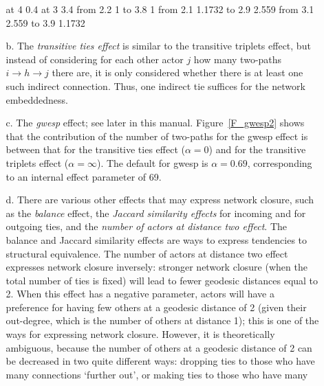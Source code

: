 \documentclass[a4paper,fleqn,11pt]{article}
\newcommand{\+}{\, + \,}
\begin{document}
\begin{enumerate}
\begin{enumerate}
\begin{minipage}[t]{.2\textwidth}
\begin{center}
 at 4 0.4
 at 3 3.4
\arrow <2mm> [.2,.6]  from 2.2 1 to 3.8 1
\arrow <2mm> [.2,.6]  from 2.1 1.1732 to 2.9 2.559
\arrow <2mm> [.2,.6]  from 3.1 2.559 to 3.9 1.1732
\endpicture
\end{center}
\end{minipage}
      \item[b.] The \emph{transitive ties effect} is similar to the transitive
                triplets effect, but instead of considering for each other actor $j$
                how many two-paths $i \rightarrow h \rightarrow j $ there are,
                it is only considered whether there is at least one such indirect connection.
                Thus, one indirect tie suffices for the network embeddedness.
      \item[c.] The \emph{gwesp} effect; see later in this manual.
                Figure~\ref{F_gwesp2} shows that the contribution of the number of
                two-paths for the gwesp effect is between that for the transitive
                ties effect ($\alpha = 0$) and for the transitive
                triplets effect ($\alpha = \infty$). The default for gwesp
                is  $\alpha = 0.69$, corresponding to an internal effect
                parameter of 69.
      \item[d.] There are various other effects that may express network closure,
                such as the \emph{balance} effect, the
                \emph{Jaccard similarity effects} for incoming and for outgoing ties,
                and the \emph{number of actors at distance two effect}.
                The balance and Jaccard similarity effects are ways to express
                tendencies to structural equivalence.
                The number of actors at distance two effect expresses network
                closure inversely:
                stronger network closure (when the total number of ties is fixed)
                will lead to fewer geodesic distances equal to 2.
                When this effect has a negative parameter, actors will have a preference
                for having few others at a geodesic distance of 2 (given their
                out-degree, which is the number of others at distance 1);
                this is one of the ways for expressing network closure.
                However, it is theoretically ambiguous, because the number of
                others at a geodesic distance of 2 can be decreased in two
                quite different ways: dropping ties to those who have many
                connections `further out', or making ties to those who have many

\end{enumerate}
\end{enumerate}
\end{document}
